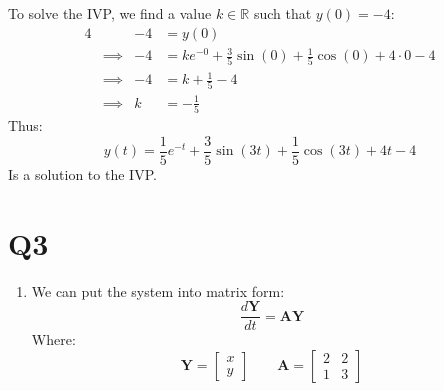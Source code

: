 \documentclass[a4paper, 11pt]{article}
\newcommand{\RR}{\mathbb{R}}
\begin{document}
\begin{enumerate}[label=(\alph*)]
  To solve the IVP, we find a value $k\in\RR$ such that $y(0)=-4$:
  \begin{alignat*}{4}
    &        & -4&=y(0)\\
    &\implies& -4&=ke^{-0}+\frac35\sin(0)+\frac15\cos(0)+4\cdot0-4\\
    &\implies& -4&=k+\frac15-4\\
    &\implies&  k&=-\frac15
  \end{alignat*}
  Thus:
  $$y(t)=\frac15e^{-t}+\frac35\sin(3t)+\frac15\cos(3t)+4t-4$$
  Is a solution to the IVP.
  \end{enumerate}


\section*{Q3}
\begin{enumerate}[label=(\alph*)]
  \item We can put the system into matrix form: 
  $$
  \frac{d\mathbf{Y}}{dt}
    =\mathbf{A}
    \mathbf{Y}
  $$
  Where: 
  $$\mathbf{Y}=\begin{bmatrix}
    x \\ 
    y
  \end{bmatrix}\qquad\mathbf{A}=\begin{bmatrix}
    2 & 2\\
    1 & 3
  \end{bmatrix}
  $$
  

\end{enumerate}
\end{document}
